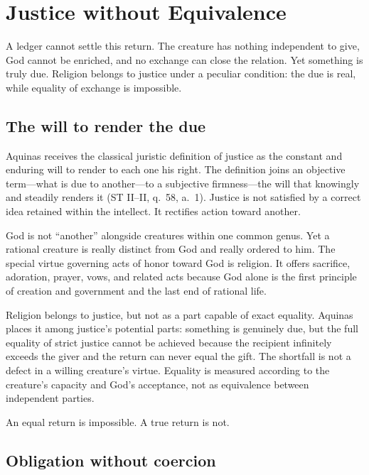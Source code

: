 \section{Justice without Equivalence}

A ledger cannot settle this return. The creature has nothing independent to give, God cannot be enriched, and no exchange can close the relation. Yet something is truly due. Religion belongs to justice under a peculiar condition: the due is real, while equality of exchange is impossible.

\subsection{The will to render the due}

Aquinas receives the classical juristic definition of justice as the constant and enduring will to render to each one his right. The definition joins an objective term---what is due to another---to a subjective firmness---the will that knowingly and steadily renders it (ST II--II, q.~58, a.~1). Justice is not satisfied by a correct idea retained within the intellect. It rectifies action toward another.

God is not ``another'' alongside creatures within one common genus. Yet a rational creature is really distinct from God and really ordered to him. The special virtue governing acts of honor toward God is religion. It offers sacrifice, adoration, prayer, vows, and related acts because God alone is the first principle of creation and government and the last end of rational life.

Religion belongs to justice, but not as a part capable of exact equality. Aquinas places it among justice's potential parts: something is genuinely due, but the full equality of strict justice cannot be achieved because the recipient infinitely exceeds the giver and the return can never equal the gift. The shortfall is not a defect in a willing creature's virtue. Equality is measured according to the creature's capacity and God's acceptance, not as equivalence between independent parties.

An equal return is impossible. A true return is not.

\subsection{Obligation without coercion}

